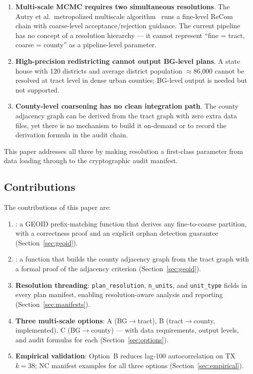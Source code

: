 \begin{enumerate}
  \item \textbf{Multi-scale MCMC requires two simultaneous resolutions}.
        The Autry et al.\ metropolized multiscale algorithm~\citep{autry2021multiscale}
        runs a fine-level ReCom chain with coarse-level acceptance/rejection
        guidance.
        The current pipeline has no concept of a resolution hierarchy ---
        it cannot represent ``fine = tract, coarse = county'' as a
        pipeline-level parameter.
  \item \textbf{High-precision redistricting cannot output BG-level plans}.
        A state house with 120 districts and average district population
        $\approx$86{,}000 cannot be resolved at tract level in dense urban
        counties; BG-level output is needed but not supported.
  \item \textbf{County-level coarsening has no clean integration path}.
        The county adjacency graph can be derived from the tract graph with
        zero extra data files, yet there is no mechanism to build it
        on-demand or to record the derivation formula in the audit chain.
\end{enumerate}

This paper addresses all three by making resolution a first-class parameter
from data loading through to the cryptographic audit manifest.

\subsection{Contributions}

The contributions of this paper are:

\begin{enumerate}
  \item \textbf{\derive{}}: a GEOID prefix-matching function that derives
        any fine-to-coarse partition, with a correctness proof and an
        explicit orphan detection guarantee (Section~\ref{sec:geoid}).
  \item \textbf{\buildc{}}: a function that builds the county adjacency graph
        from the tract graph with a formal proof of the adjacency criterion
        (Section~\ref{sec:geoid}).
  \item \textbf{Resolution threading}: \texttt{plan\_resolution}, \texttt{n\_units},
        and \texttt{unit\_type} fields in every plan manifest, enabling
        resolution-aware analysis and reporting (Section~\ref{sec:manifests}).
  \item \textbf{Three multi-scale options}: A (BG$\to$tract), B (tract$\to$county,
        implemented), C (BG$\to$county) — with data requirements, output levels,
        and audit formulas for each (Section~\ref{sec:options}).
  \item \textbf{Empirical validation}: Option~B reduces lag-100 autocorrelation
        on TX $k=38$; NC manifest examples for all three options
        (Section~\ref{sec:empirical}).
\end{enumerate}

